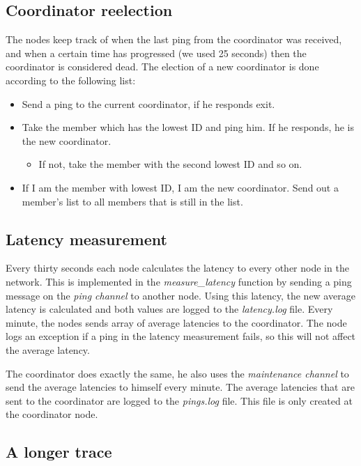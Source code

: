 \documentclass[paper=a4, fontsize=11pt]{scrartcl} %
\numberwithin{equation}{section} %
\numberwithin{figure}{section} %
\numberwithin{table}{section} %
\begin{document}
\subsection{Coordinator reelection}
The nodes keep track of when the last ping from the coordinator was received, and when a certain time has progressed (we used 25 seconds) then the coordinator is considered dead. The election of a new coordinator is done according to the following list:
\begin{itemize}
	\item Send a ping to the current coordinator, if he responds exit.
	\item Take the member which has the lowest ID and ping him. If he responds, he is the new coordinator.
	\begin{itemize}
		\item If not, take the member with the second lowest ID and so on.
	\end{itemize}
	\item If I am the member with lowest ID, I am the new coordinator. Send out a member's list to all members that is still in the list.
\end{itemize}


\subsection{Latency measurement}

Every thirty seconds each node calculates the latency to every other node in the network. This is implemented in the \textit{measure\_latency} function by sending a ping message on the \textit{ping channel} to another node. Using this latency, the new average latency is calculated and both values are logged to the \textit{latency.log} file. Every minute, the nodes sends array of average latencies to the coordinator. The node logs an exception if a ping in the latency measurement fails, so this will not affect the average latency.

The coordinator does exactly the same, he also uses the \textit{maintenance channel} to send the average latencies to himself every minute. The average latencies that are sent to the coordinator are logged to the \textit{pings.log} file. This file is only created at the coordinator node.

\subsection{A longer trace}
\end{document}
